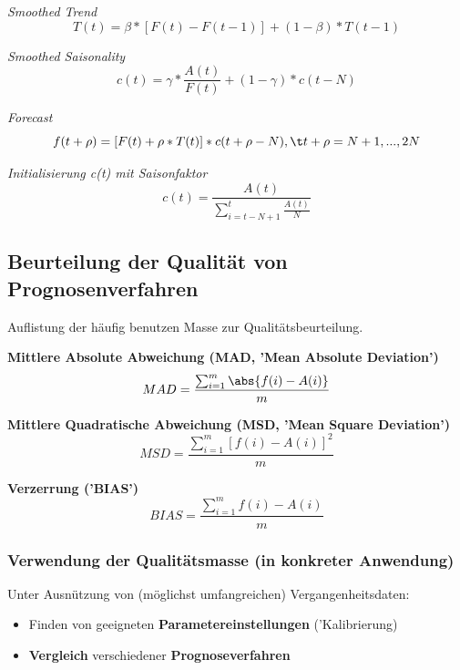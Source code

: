 \documentclass{report}
\theoremstyle{definition}
\theoremstyle{example}
\begin{document}
   \textit{Smoothed Trend}
\begin{equation}
   T(t) = \beta * [F(t) - F(t-1)] + (1-\beta) * T(t-1)
\end{equation}

   \textit{Smoothed Saisonality}
\begin{equation}
   c(t) = \gamma * \frac{A(t)}{F(t)} + (1-\gamma) * c(t-N)
\end{equation}

   \textit{Forecast}
\begin{equation}
   f(t+\rho) = [F(t) + \rho * T(t)] * c(t+\rho - N), \t t+\rho = N + 1,..., 2N   
\end{equation}

   \textit{Initialisierung c(t) mit Saisonfaktor}
\begin{equation}
   c(t) = \frac{A(t)}{\sum^t_{i=t-N+1} \frac{A(t)}{N}}
\end{equation}


   \subsection{Beurteilung der Qualität von Prognosenverfahren}
Auflistung der häufig benutzen Masse zur Qualitätsbeurteilung.

   \textbf{Mittlere Absolute Abweichung (MAD, 'Mean Absolute Deviation')}\\
\begin{equation}
   MAD = \frac{ \sum^m_{i=1} \abs{ f(i) - A(i)} }{m}
\end{equation}

   \textbf{Mittlere Quadratische Abweichung (MSD, 'Mean Square Deviation')}\\
\begin{equation}
   MSD = \frac{ \sum^m_{i=1} [f(i)-A(i)]^2 }{m}
\end{equation}

   \textbf{Verzerrung ('BIAS')}
\begin{equation}
   BIAS = \frac{ \sum^m_{i=1} f(i) - A(i) }{m}
\end{equation}

      \subsubsection{Verwendung der Qualitätsmasse (in konkreter Anwendung)}
Unter Ausnützung von (möglichst umfangreichen) Vergangenheitsdaten:
\begin{itemize}
   \item Finden von geeigneten \textbf{Parametereinstellungen} ('Kalibrierung)
   \item \textbf{Vergleich} verschiedener \textbf{Prognoseverfahren}
\end{itemize}
\end{document}
